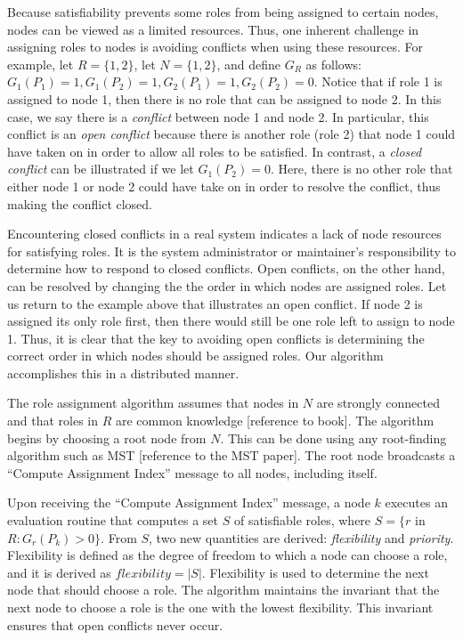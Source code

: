 \documentclass[11pt]{article}
\begin{document}
\begin{multicols}{2}
Because satisfiability prevents some roles from being assigned to certain nodes, nodes can be viewed as a limited resources. Thus, one inherent challenge in assigning roles to nodes is avoiding conflicts when using these resources. For example, let $R = \{1, 2\}$, let $N = \{1, 2\}$, and define $G_{R}$ as follows: $G_{1}(P_{1}) = 1, G_{1}(P_{2}) = 1, G_{2}(P_{1}) = 1, G_{2}(P_{2}) = 0$. Notice that if role 1 is assigned to node 1, then there is no role that can be assigned to node 2. In this case, we say there is a \textit{conflict} between node 1 and node 2. In particular, this conflict is an \textit{open conflict} because there is another role (role 2) that node 1 could have taken on in order to allow all roles to be satisfied. In contrast, a \textit{closed conflict} can be illustrated if we let $G_{1}(P_{2}) = 0$. Here, there is no other role that either node 1 or node 2 could have take on in order to resolve the conflict, thus making the conflict closed.

Encountering closed conflicts in a real system indicates a lack of node resources for satisfying roles. It is the system administrator or maintainer's responsibility to determine how to respond to closed conflicts. Open conflicts, on the other hand, can be resolved by changing the the order in which nodes are assigned roles. Let us return to the example above that illustrates an open conflict. If node 2 is assigned its only role first, then there would still be one role left to assign to node 1. Thus, it is clear that the key to avoiding open conflicts is determining the correct order in which nodes should be assigned roles. Our algorithm accomplishes this in a distributed manner.

The role assignment algorithm assumes that nodes in $N$ are strongly connected and that roles in $R$ are common knowledge [reference to book]. The algorithm begins by choosing a root node from $N$. This can be done using any root-finding algorithm such as MST [reference to the MST paper]. The root node broadcasts a ``Compute Assignment Index'' message to all nodes, including itself.

Upon receiving the ``Compute Assignment Index'' message, a node $k$ executes an evaluation routine that computes a set $S$ of satisfiable roles, where $S = \{r$ in $R : G_{r}(P_{k}) > 0\}$. From $S$, two new quantities are derived: \textit{flexibility} and \textit{priority}. Flexibility is defined as the degree of freedom to which a node can choose a role, and it is derived as $flexibility = |S|$. Flexibility is used to determine the next node that should choose a role. The algorithm maintains the invariant that the next node to choose a role is the one with the lowest flexibility. This invariant ensures that open conflicts never occur.


\end{multicols}
\end{document}
